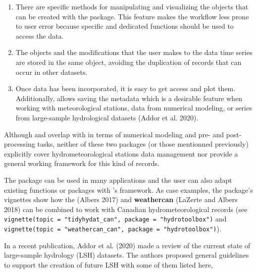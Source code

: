 \begin{enumerate}
\def\labelenumi{\alph{enumi}.}
\item
  There are specific methods for manipulating and visualizing the objects
  that can be created with the package. This feature makes the workflow
  less prone to user error because specific and dedicated functions should
  be used to access the data.
\item
  The objects and the modifications that the user makes to the data time
  series are stored in the same object, avoiding the duplication of records
  that can occur in other datasets.
\item
  Once data has been incorporated, it is easy to get access and plot them.
  Additionally,  allows saving the metadata which is a desirable
  feature when working with meteorological stations, data from numerical modeling, or
  series from large-sample hydrological datasets (Addor et al. 2020).
\end{enumerate}

\noindent 
Although  and  overlap with 
in terms of numerical modeling and pre- and post-processing tasks,
neither of these two packages (or those mentionned previously) explicitly
cover hydrometeorological stations data management nor
provide a general working framework for this kind of records.

The package can be used in many applications and the user can also adapt
existing functions or packages with 's framework.
As case examples, the package's vignettes show how the 
(Albers 2017) and \textbf{weathercan} (LaZerte and Albers 2018) can be combined to work
with Canadian hydrometeorological records
(see \texttt{vignette(topic\ =\ "tidyhydat\_can",\ package\ =\ "hydrotoolbox")} and
\texttt{vignette(topic\ =\ "weathercan\_can",\ package\ =\ "hydrotoolbox")}).

In a recent publication, Addor et al. (2020) made a review of the current
state of large-sample hydrology (LSH) datasets. The authors proposed
general guidelines to support the creation of future LSH with some of
them listed here,

